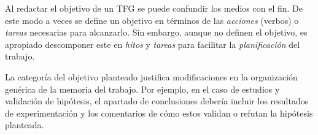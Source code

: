 Al redactar el objetivo de un TFG se puede confundir los medios con el fin. De este modo a veces se define un objetivo en términos de las \emph{acciones} (verbos) o \emph{tareas} necesarias para alcanzarlo. Sin embargo, aunque no definen el objetivo, es apropiado descomponer este en \emph{hitos} y \emph{tareas} para facilitar la \emph{planificación} del trabajo.

La categoría del objetivo planteado justifica modificaciones en la organización genérica de la memoria del trabajo. Por ejemplo, en el caso de estudios y validación de hipótesis, el apartado de conclusiones debería incluir los resultados de experimentación y los comentarios de cómo estos validan o refutan la hipótesis planteada.

